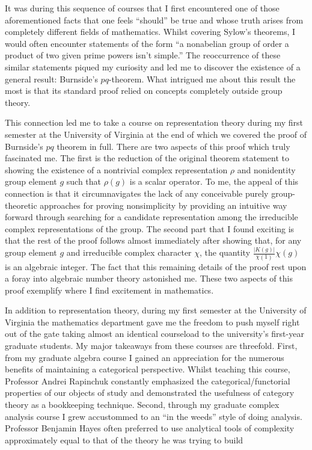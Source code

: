 \documentclass[12pt]{article}
\begin{document}
It was during this sequence of courses that I first encountered one of those aforementioned facts that one feels ``should'' be true and whose truth arises from completely different fields of mathematics. Whilst covering Sylow's theorems, I would often encounter statements of the form ``a nonabelian group of order a product of two given prime powers isn't simple.'' The reoccurrence of these similar statements piqued my curiosity and led me to discover the existence of a general result: Burnside's $pq$-theorem. What intrigued me about this result the most is that its standard proof relied on concepts completely outside group theory.

This connection led me to take a course on representation theory during my first semester at the University of Virginia at the end of which we covered the proof of Burnside's $pq$ theorem in full. There are two aspects of this proof which truly fascinated me. The first is the reduction of the original theorem statement to showing the existence of a nontrivial complex representation $\rho$ and nonidentity group element $g$ such that $\rho(g)$ is a scalar operator. To me, the appeal of this connection is that it circumnavigates the lack of any conceivable purely group-theoretic approaches for proving nonsimplicity by providing an intuitive way forward through searching for a candidate representation among the irreducible complex representations of the group. The second part that I found exciting is that the rest of the proof follows almost immediately after showing that, for any group element $g$ and irreducible complex character $\chi$, the quantity $\frac{|K(g)|}{\chi(1)}\chi(g)$ is an algebraic integer. The fact that this remaining details of the proof rest upon a foray into algebraic number theory astonished me. These two aspects of this proof exemplify where I find excitement in mathematics.


In addition to representation theory, during my first semester at the University of Virginia the mathematics department gave me the freedom to push myself right out of the gate taking almost an identical courseload to the university's first-year graduate students. My major takeaways from these courses are threefold. First, from my graduate algebra course I gained an appreciation for the numerous benefits of maintaining a categorical perspective.
Whilst teaching this course, Professor Andrei Rapinchuk constantly emphasized the categorical/functorial properties of our objects of study and demonstrated the usefulness of category theory as a bookkeeping technique. Second, through my graduate complex analysis course I grew accustommed to an ``in the weeds'' style of doing analysis. Professor Benjamin Hayes often preferred to use analytical tools of complexity approximately equal to that of the theory he was trying to build
\end{document}
